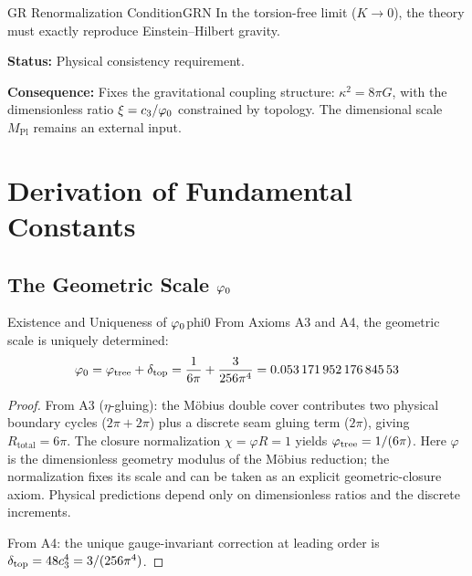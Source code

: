\begin{axiom}{GR Renormalization Condition}{GRN}
In the torsion-free limit ($K \to 0$), the theory must exactly reproduce 
Einstein--Hilbert gravity.

\tcblower
\textbf{Status:} Physical consistency requirement.

\textbf{Consequence:} Fixes the gravitational coupling structure:
$\kappa^2 = 8\pi G$, with the dimensionless ratio $\xi = c_3/\varphi_0$ constrained by topology.
The dimensional scale $M_{\mathrm{Pl}}$ remains an external input.
\end{axiom}

\section{Derivation of Fundamental Constants}

\subsection{\texorpdfstring{The Geometric Scale $\varphi_0$}{The Geometric Scale phi0}}

\begin{theorem}{Existence and Uniqueness of $\varphi_0$}{phi0}
From Axioms A3 and A4, the geometric scale is uniquely determined:
\begin{equation}
    \phiz = \phitree + \deltatop = \frac{1}{6\pi} + \frac{3}{256\pi^4} = \num[round-mode=places,round-precision=17]{\TFPTvarphiZeroNum}
\end{equation}
\end{theorem}

\begin{proof}
From A3 ($\eta$-gluing): the M\"obius double cover contributes two physical boundary
cycles ($2\pi+2\pi$) plus a discrete seam gluing term ($2\pi$), giving
$R_{\text{total}}=6\pi$. The closure normalization $\chi = \varphi R = 1$
yields $\varphi_{\mathrm{tree}} = 1/(6\pi)$.
Here $\varphi$ is the dimensionless geometry modulus of the M\"obius reduction; the
normalization fixes its scale and can be taken as an explicit geometric-closure axiom.
Physical predictions depend only on dimensionless ratios and the discrete increments.

From A4: the unique gauge-invariant correction at leading order is 
$\delta_{\mathrm{top}} = 48c_3^4 = 3/(256\pi^4)$.
\end{proof}

